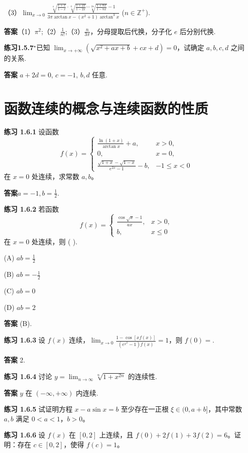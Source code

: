 \documentclass[lang=cn,10pt]{elegantbook}
\begin{document}
（3）$\lim_{x\rightarrow 0} \frac{\sqrt[4]{\frac{1+x}{1-x}} \cdot \sqrt[6]{\frac{1+2x}{1-2x}} \cdots \sqrt[2n]{\frac{1+nx}{1-nx}} - 1}{3\pi \arctan x - (x^2 + 1) \arctan^3 x}$ ($n \in \mathbb{Z}^+$).

\textbf{答案}（1）$\pi^2$;（2）$\frac{1}{n!}$;（3）$\frac{n}{3\pi}$，分母提取后代换，分子化 $e$ 后分别代换.


\textbf{练习1.5.7}${ }^{\star}$已知 $\lim_{x\rightarrow +\infty} \left( \sqrt{x^2 + ax + b} + cx + d \right) = 0$，试确定 $a, b, c, d$ 之间的关系.

\textbf{答案} $a + 2d = 0$, $c = -1$, $b, d$ 任意.
\section{函数连续的概念与连续函数的性质}
\textbf{练习 1.6.1 }设函数
\[
f(x) = 
\begin{cases} 
\frac{\ln(1+x)}{\arctan x} + a, & x > 0, \\
0, & x = 0, \\
\frac{\sqrt{1+x} - \sqrt{1-x}}{e^{2x} - 1} - b, & -1 \leq x < 0
\end{cases}
\]
在 \(x = 0\) 处连续，求常数 \(a, b\)。

\textbf{答案}$a=-1,b=\frac{1}{2}$. 


\textbf{练习 1.6.2} 若函数
\[
f(x) = 
\begin{cases} 
\frac{\cos\sqrt{x} - 1}{ax}, & x > 0, \\
b, & x \leq 0
\end{cases}
\]
在 \(x = 0\) 处连续，则 ( ).

(A) \(ab = \frac{1}{2}\) 

(B) \(ab = -\frac{1}{2}\) 

(C) \(ab = 0\) 

(D) \(ab = 2\)

\textbf{答案} (B).


\textbf{练习 1.6.3} 设 \(f(x)\) 连续，\(\lim_{x \to 0} \frac{1 - \cos[xf(x)]}{(e^{x^2} - 1)f(x)} = 1\)，则 \(f(0) = \).

\textbf{答案} 2.


\textbf{练习 1.6.4} 讨论 \( y = \lim_{n \to \infty} \sqrt[n]{1 + x^{2n}} \) 的连续性.

\textbf{答案} \( y \) 在 \( (-\infty, +\infty) \) 内连续.


\textbf{练习 1.6.5 }试证明方程 \( x - a\sin x = b \) 至少存在一正根 \( \xi \in (0, a+b] \)，其中常数 \( a, b \) 满足 \( 0 < a < 1 \)，\( b > 0 \)。


\textbf{练习 1.6.6} 设 $f(x)$ 在 $[0,2]$ 上连续，且 $f(0) + 2f(1) + 3f(2) = 6$。证明：存在 $c \in [0,2]$，使得 $f(c) = 1$。
\end{document}

